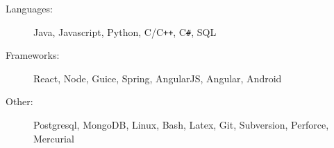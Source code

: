 

\begin{description}
  \item[Languages:]
    \hspace{.4em} 
    Java, Javascript, Python, C/C{}\verb!++!, C{}\verb!#!, SQL
  \item[Frameworks:]  
    React, Node, Guice, Spring, AngularJS, Angular, Android
  \item[Other:]
    \hspace{2.9 em} 
    Postgresql, MongoDB, Linux, Bash, Latex, Git, Subversion, Perforce, Mercurial
\end{description}
